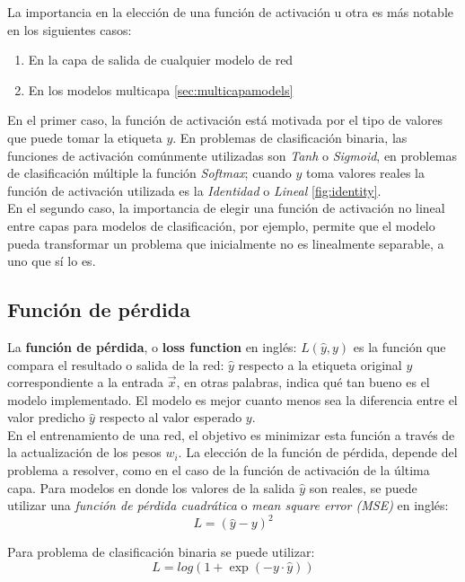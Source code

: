 La importancia en la elección de una función de activación u otra es más notable en los siguientes casos:
\begin{enumerate}
\item En la capa de salida de cualquier modelo de red
\item En los modelos multicapa \autoref{sec:multicapamodels}
\end{enumerate}
En el primer caso, la función de activación está motivada por el tipo de valores que puede tomar la etiqueta $y$. En problemas de clasificación binaria, las funciones de activación comúnmente utilizadas son \emph{Tanh} o \emph{Sigmoid}, en problemas de clasificación múltiple la función \emph{Softmax}; cuando $y$ toma valores reales la función de activación utilizada es la \emph{Identidad} o \emph{Lineal} \autoref{fig:identity}.
\\
En el segundo caso, la importancia de elegir una función de activación no lineal entre capas para modelos de clasificación, por ejemplo, permite que el modelo pueda transformar un problema que inicialmente no es linealmente separable, a uno que sí lo es.


\subsection{Función de pérdida}
La \textbf{función de pérdida}, o \textbf{loss function} en inglés: $L(\hat{y},y)$ es la función que compara el resultado o salida de la red: $\hat{y}$ respecto a la etiqueta original $y$ correspondiente a la entrada $\vec{x}$, en otras palabras, indica qué tan bueno es el modelo implementado. El modelo es mejor cuanto menos sea la diferencia entre el valor predicho $\hat{y}$ respecto al valor esperado $y$.
\\
En el entrenamiento de una red, el objetivo es minimizar esta función a través de la actualización de los pesos $w_i$. La elección de la función de pérdida, depende del problema a resolver, como en el caso de la función de activación de la última capa. Para modelos en donde los valores de la salida $\hat{y}$ son reales, se puede utilizar una \emph{función de pérdida cuadrática} o \emph{mean square error (MSE)} en inglés:
\begin{equation}
  \label{eq:MSE}
  L = (\hat{y}-y)^2
\end{equation}

Para problema de clasificación binaria se puede utilizar:
\begin{equation}
  \label{eq:bin}
  L = log(1 + \exp(−y\cdot \hat{y}))
\end{equation}

